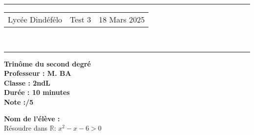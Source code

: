\documentclass[a4paper,12pt]{article}
\begin{document}
\hrule %
\begin{center}
    \begin{tabular}{@{} p{5cm} p{5cm} p{5cm} @{}} %
        Lycée Dindéfélo & \quad\quad\quad Test 3 & 18 Mars 2025 \\
    \end{tabular}
    \\[-0.01cm] %
    \hrule %
\end{center}
\begin{center}
    \textbf{\Large Trinôme du second degré} \\[0.2cm]
    \textbf{\large Professeur : M. BA} \\[0.2cm]
    \textbf{Classe : 2ndL} \\[0.2cm]
    \textbf{\small Durée : 10 minutes} \\[0.2cm]
    \textbf{\small Note :\quad\quad\quad /5}
\end{center}

\textbf{\small Nom de l'élève :} \underline{\hspace{8cm}} \\[0.5cm]

Résoudre dans \(\mathbb{R}\): \( x^2 - x - 6 > 0\)
\end{document}
